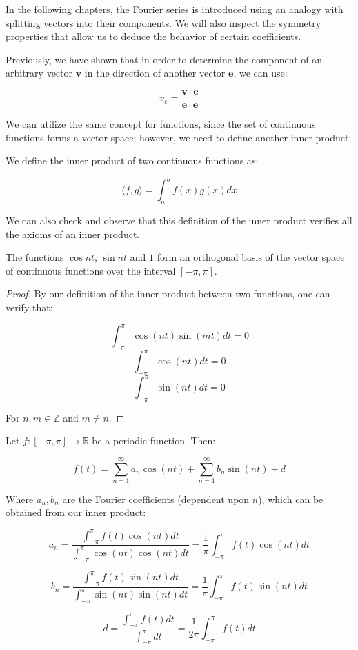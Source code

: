 \documentclass[12pt]{article}
\begin{document}
In the following chapters, the Fourier series is introduced using an analogy with splitting vectors into their components. We will also inspect the symmetry properties that allow us to deduce the behavior of certain coefficients.

Previously, we have shown that in order to determine the component of an arbitrary vector $\mathbf{v}$ in the direction of another vector $\mathbf{e}$, we can use:

\[ v_e = \frac{\mathbf{v} \cdot \mathbf{e}}{\mathbf{e} \cdot \mathbf{e}} \]

We can utilize the same concept for functions, since the set of continuous functions forms a vector space; however, we need to define another inner product:

\begin{proposition}
    We define the inner product of two continuous functions as:

    \[ \langle f, g \rangle = \int_a^b f(x)g(x)dx \]

    We can also check and observe that this definition of the inner product verifies all the axioms of an inner product.
\end{proposition}

\begin{proposition}
    The functions $\cos{nt}$, $\sin{nt}$ and $1$ form an orthogonal basis of the vector space of continuous functions over the interval $[-\pi, \pi]$.
\end{proposition}

\begin{proof}
    By our definition of the inner product between two functions, one can verify that:

    \[ \int_{-\pi}^{\pi} \cos{(nt)}\sin{(mt)}dt = 0 \]
    \[ \int_{-\pi}^{\pi} \cos{(nt)}dt = 0 \]
    \[ \int_{-\pi}^{\pi} \sin{(nt)}dt = 0 \]

    For $n, m \in \mathbb{Z}$ and $m \neq n$.
\end{proof}

\begin{theorem}
    Let $f : [-\pi, \pi] \to \mathbb{R}$ be a periodic function. Then:

    \[ f(t) = \sum_{n = 1}^\infty a_n\cos{(nt)} + \sum_{n = 1}^\infty b_n\sin{(nt)} + d \]

    Where $a_n, b_n$ are the Fourier coefficients (dependent upon $n$), which can be obtained from our inner product:

    \[ a_n = \frac{\int_{-\pi}^{\pi} f(t)\cos{(nt)}dt}{\int_{-\pi}^{\pi} \cos{(nt)}\cos{(nt)}dt} = \frac{1}{\pi} \int_{-\pi}^{\pi} f(t)\cos{(nt)}dt \]
    
    \[ b_n = \frac{\int_{-\pi}^{\pi} f(t)\sin{(nt)}dt}{\int_{-\pi}^{\pi} \sin{(nt)}\sin{(nt)}dt} = \frac{1}{\pi} \int_{-\pi}^{\pi} f(t)\sin{(nt)}dt \]
    
    \[ d = \frac{\int_{-\pi}^{\pi} f(t)dt}{\int_{-\pi}^{\pi} dt} = \frac{1}{2\pi}\int_{-\pi}^{\pi} f(t)dt \]
\end{theorem}
\end{document}
